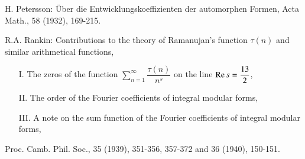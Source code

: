 \begin{thebibliography}{99}
 H. Petersson: \"Uber die Entwicklungskoeffizienten der
  automorphen Formen, Acta Math., 58 (1932), 169-215.

 R.A. Rankin: Contributions to the theory of
  Ramanujan's function $\tau(n)$ and similar arithmetical functions,
\begin{itemize}
\item[I.] The zeros of the function
  $\sum\limits^{\infty}_{n=1}\dfrac{\tau(n)}{n^s}$ on the line $\operatorname{Re} s =
  \dfrac{13}{2}$,

\item[II.] The order of the Fourier coefficients of integral modular
  forms, 

\item[III.] A note on the sum function of the Fourier coefficients of
  integral modular forms,
\end{itemize}

Proc. Camb. Phil. Soc., 35 (1939), 351-356, 357-372 and 36 (1940),
150-151. 
\end{thebibliography}
